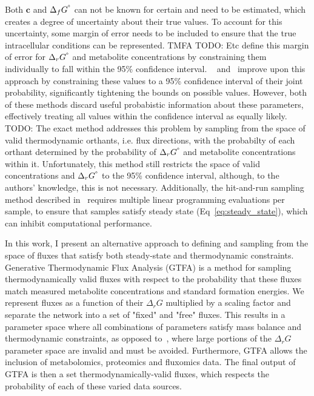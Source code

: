 \documentclass[10pt,letterpaper]{article}
\newcommand{\sdgf}{\Delta_fG^{\degree}}
\newcommand{\dgr}{\Delta_rG}
\newcommand{\sdgr}{\Delta_rG^{\degree}}
\begin{document}

Both $\mathbf{c}$ and $\sdgf$ can not be known for certain and need to be estimated, which creates a degree of uncertainty about their true values.
To account for this uncertainty, some margin of error needs to be included to ensure that the true intracellular conditions can be represented.
TMFA {TODO: Etc} define this margin of error for $\sdgr$ and metabolite concentrations by constraining them individually to fall within the 95\% confidence interval.
~\cite{multiTFA} and~\cite{PTA} improve upon this approach by constraining these values to a 95\% confidence interval of their joint probability, significantly tightening the bounds on possible values.
However, both of these methods discard useful probabistic information about these parameters, effectively treating all values within the confidence interval as equally likely.
~\cite{PTA} {TODO: The exact method} addresses this problem by sampling from the space of valid thermodynamic orthants, i.e. flux directions, with the probabilty of each orthant determined by the probability of $\sdgr$ and metabolite concentrations within it.
Unfortunately, this method still restricts the space of valid concentrations and $\sdgr$ to the 95\% confidence interval, although, to the authors' knowledge, this is not necessary.
Additionally, the hit-and-run sampling method described in~\cite{PTA} requires multiple linear programming evaluations per sample, to ensure that samples satisfy steady state (Eq~\ref{eq:steady_state}), which can inhibit computational performance.

In this work, I present an alternative approach to defining and sampling from the space of fluxes that satisfy both steady-state and thermodynamic constraints.
Generative Thermodynamic Flux Analysis (GTFA) is a method for sampling thermodynamically valid fluxes with respect to the probability that these fluxes match measured metabolite concentrations and standard formation energies.
We represent fluxes as a function of their $\dgr$ multiplied by a scaling factor and separate the network into a set of "fixed" and "free" fluxes.
This results in a parameter space where all combinations of parameters satisfy mass balance and thermodynamic constraints, as opposed to~\cite{PTA}, where large portions of the $\dgr$ parameter space are invalid and must be avoided.
Furthermore, GTFA allows the inclusion of metabolomics, proteomics and fluxomics data.
The final output of GTFA is then a set thermodynamically-valid fluxes, which respects the probability of each of these varied data sources.
\end{document}
